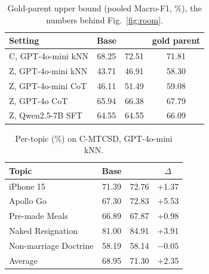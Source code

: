 \begin{table}[H]
\centering
\caption{Gold-parent upper bound (pooled Macro-F1, \%), the numbers behind Fig.~\ref{fig:room}.}
\label{tab:room}
\small
\begin{tabular}{@{}lccc@{}}
\toprule
Setting & Base & \spin{} & gold parent \\
\midrule
C, GPT-4o-mini kNN & 68.25 & 72.51 & 71.81 \\
Z, GPT-4o-mini kNN & 43.71 & 46.91 & 58.30 \\
Z, GPT-4o-mini CoT & 46.11 & 51.49 & 59.08 \\
Z, GPT-4o CoT & 65.94 & 66.38 & 67.79 \\
Z, Qwen2.5-7B SFT & 64.55 & 64.55 & 66.09 \\
\bottomrule
\end{tabular}
\end{table}

\begin{table}[H]
\centering
\caption{Per-topic \favg{} (\%) on C-MTCSD, GPT-4o-mini kNN.}
\label{tab:topic}
\small
\begin{tabular}{@{}lccc@{}}
\toprule
Topic & Base & \spin{} & $\Delta$ \\
\midrule
iPhone 15 & 71.39 & 72.76 & +1.37 \\
Apollo Go & 67.30 & 72.83 & +5.53 \\
Pre-made Meals & 66.89 & 67.87 & +0.98 \\
Naked Resignation & 81.00 & 84.91 & +3.91 \\
Non-marriage Doctrine & 58.19 & 58.14 & $-0.05$ \\
\midrule
Average & 68.95 & 71.30 & +2.35 \\
\bottomrule
\end{tabular}
\end{table}

